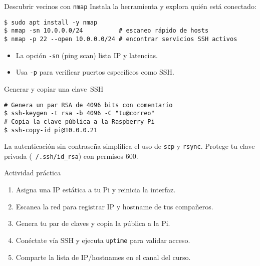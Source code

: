\documentclass[aspectratio=169,professionalfonts]{beamer}
\begin{document}
\begin{frame}[fragile]{Descubrir vecinos con \texttt{nmap}}
  Instala la herramienta y explora quién está conectado:
  \begin{verbatim}
$ sudo apt install -y nmap
$ nmap -sn 10.0.0.0/24          # escaneo rápido de hosts
$ nmap -p 22 --open 10.0.0.0/24 # encontrar servicios SSH activos
  \end{verbatim}
  \begin{itemize}
    \item La opción \texttt{-sn} (ping scan) lista IP y latencias.
    \item Usa \texttt{-p} para verificar puertos específicos como SSH.
  \end{itemize}
\end{frame}

\begin{frame}[fragile]{Generar y copiar una clave SSH}
  \begin{verbatim}
# Genera un par RSA de 4096 bits con comentario
$ ssh-keygen -t rsa -b 4096 -C "tu@correo"
# Copia la clave pública a la Raspberry Pi
$ ssh-copy-id pi@10.0.0.21
  \end{verbatim}
  \begin{infobox}
  La autenticación sin contraseña simplifica el uso de \texttt{scp} y \texttt{rsync}. Protege tu clave privada (\texttt{~/.ssh/id\_rsa}) con permisos 600.
  \end{infobox}
\end{frame}

\begin{frame}[fragile]{Actividad práctica}
  \begin{enumerate}
    \item Asigna una IP estática a tu Pi y reinicia la interfaz.
    \item Escanea la red para registrar IP y hostname de tus compañeros.
    \item Genera tu par de claves y copia la pública a la Pi.
    \item Conéctate vía SSH y ejecuta \texttt{uptime} para validar acceso.
    \item Comparte la lista de IP/hostnames en el canal del curso.
  \end{enumerate}
\end{frame}
\end{document}
